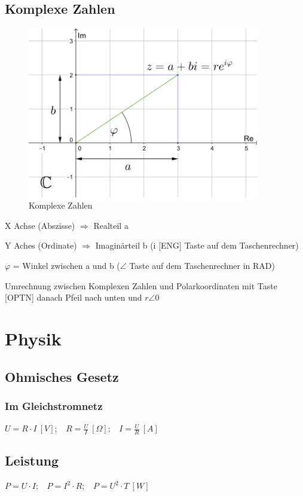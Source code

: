 \documentclass[12pt,a4paper]{article}
\begin{document}
\subsection{Komplexe Zahlen}
\begin{figure}[h]
 \centering
 \includegraphics[width=0.9\textwidth]{"bild5.png"}
 \caption{Komplexe Zahlen}
 \label{fig:komplzahl}
\end{figure}
\begin{description}
\item X Achse (Abszisse) $\Rightarrow$ Realteil a
\item Y Aches (Ordinate) $\Rightarrow$ Imaginärteil b (i [ENG] Taste auf dem Taschenrechner)
\item $\varphi$ = Winkel zwischen a und b ($\angle$ Taste auf dem Taschenrechner in RAD)
\item Umrechnung zwischen Komplexen Zahlen und Polarkoordinaten mit Taste [OPTN] danach Pfeil nach unten und $r\angle0$
\end{description}
\pagebreak
\section{Physik}
\subsection{Ohmisches Gesetz}
\subsubsection{Im Gleichstromnetz}
$U = R \cdot I~[V];~~~~R = \frac{U}{I}~[\Omega];~~~~I = \frac{U}{R}~[A]$
\subsection{Leistung}
$P = U \cdot I;~~~~P = I^{2} \cdot R;~~~~P = U^{2} \cdot T~[W]$
\end{document}
